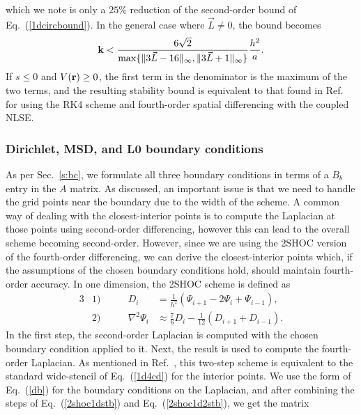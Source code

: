 \documentclass{article}
\begin{document}
which we note is only a $25\%$ reduction of the second-order bound of Eq.~(\ref{1dcircbound}).  In the general case where $\vec L \ne 0$, the bound becomes
\begin{equation}
{\bf k} < \frac{6\sqrt{2}}{\max\{\lVert3\vec L-16\rVert_{\infty},\lVert 3\vec L+1\rVert_{\infty}\}} \frac{h^2}{a}.
\end{equation}
If $s \le 0$ and $V({\bf r}) \ge 0$, the first term in the denominator is the maximum of the two terms, and the resulting stability bound is equivalent to that found in Ref.~\cite{RK4_2CNLSE_STB} for using the RK4 scheme and fourth-order spatial differencing with the coupled NLSE.

\subsubsection{Dirichlet, MSD, and L0 boundary conditions}
\label{s:1d2shoc}
As per Sec.~\ref{s:bc}, we formulate all three boundary conditions in terms of a $B_b$ entry in the $A$ matrix.  As discussed, an important issue is that we need to handle the grid points near the boundary due to the width of the scheme.  A common way of dealing with the closest-interior points is to compute the Laplacian at those points using second-order differencing, however this can lead to the overall scheme becoming second-order.  However, since we are using the 2SHOC version of the fourth-order differencing, we can derive the closest-interior points which, if the assumptions of the chosen boundary conditions hold, should maintain fourth-order accuracy.  In one dimension, the 2SHOC scheme is defined as  \cite{ME_2SHOC}
\begin{alignat}{3}
 &1) \qquad &D_i &= \frac{1}{h^2}\left(\Psi_{i+1} - 2\Psi_i + \Psi_{i-1}\right), \label{2shoc1dstb} \\
 &2) \qquad &\nabla^2\Psi_i &\approx \frac{7}{6}D_i - \frac{1}{12}\left(D_{i+1} + D_{i-1}\right). \label{2shoc1d2stb}
\end{alignat}
In the first step, the second-order Laplacian is computed with the chosen boundary condition applied to it.  Next, the result is used to compute the fourth-order Laplacian. As mentioned in Ref.~\cite{ME_2SHOC}, this two-step scheme is equivalent to the standard wide-stencil of Eq.~(\ref{1d4cd}) for the interior points.  We use the form of Eq.~(\ref{db}) for the boundary conditions on the Laplacian, and after combining the steps of Eq.~(\ref{2shoc1dstb}) and Eq.~(\ref{2shoc1d2stb}), we get the matrix
\end{document}
